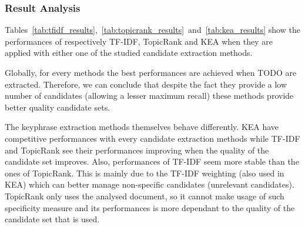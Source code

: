     \subsubsection{Result Analysis}
    \label{subsubsec:candidate_extraction_result_analysis}
      Tables~\ref{tab:tfidf_results},~\ref{tab:topicrank_results}~and~\ref{tab:kea_results}
      show the performances of respectively TF-IDF, TopicRank and KEA when
      they are applied with either one of the studied candidate extraction
      methods.

      Globally, for every methods the best performances are achieved when TODO
      are extracted. Therefore, we can conclude that despite the fact they
      provide a low number of candidates (allowing a lesser maximum recall)
      these methods provide better quality candidate sets.

      The keyphrase extraction methods themselves behave differently. KEA have
      competitive performances with every candidate extraction methods while
      TF-IDF and TopicRank see their performances improving when the quality of
      the candidate set improves. Also, performances of TF-IDF seem more stable
      than the ones of TopicRank. This is mainly due to the TF-IDF weighting
      (also used in KEA) which can better manage non-specific candidates
      (unrelevant candidates). TopicRank only uses the analysed document, so it
      cannot make usage of such specificity measure and its performances is more
      dependant to the quality of the candidate set that is used.


